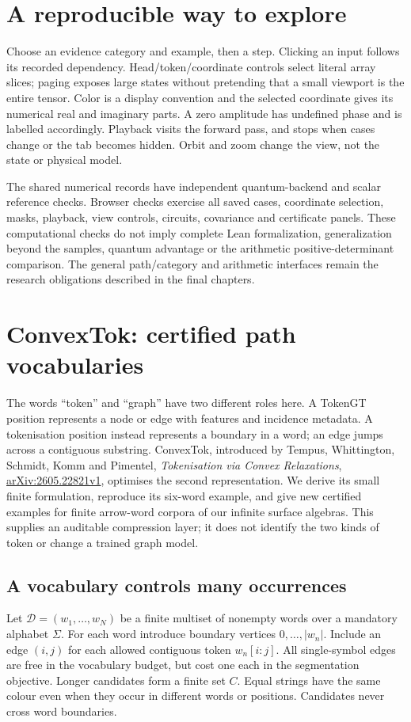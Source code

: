 \documentclass[11pt,oneside,openany]{book}
\theoremstyle{definition}\newtheorem{definition}[theorem]{Definition}
\theoremstyle{remark}\newtheorem{remark}[theorem]{Remark}
\begin{document}
\section{A reproducible way to explore}
Choose an evidence category and example, then a step. Clicking an input
follows its recorded dependency. Head/token/coordinate controls select
literal array slices; paging exposes large states without pretending that a
small viewport is the entire tensor. Color is a display convention and the
selected coordinate gives its numerical real and imaginary parts. A zero
amplitude has undefined phase and is labelled accordingly. Playback visits
the forward pass, and stops when cases change or the tab becomes hidden.
Orbit and zoom change the view, not the state or physical model.

The shared numerical records have independent quantum-backend and scalar
reference checks. Browser checks exercise all saved cases, coordinate
selection, masks, playback, view controls, circuits, covariance and certificate
panels. These computational checks do not imply complete Lean formalization,
generalization beyond the samples, quantum advantage or the arithmetic
positive-determinant comparison. The general path/category and arithmetic
interfaces remain the research obligations described in the final chapters.

\section{ConvexTok: certified path vocabularies}
\label{convextok:section}
The words ``token'' and ``graph'' have two different roles here. A TokenGT
position represents a node or edge with features and incidence metadata.
A tokenisation position instead represents a boundary in a word; an edge
jumps across a contiguous substring. ConvexTok, introduced by Tempus,
Whittington, Schmidt, Komm and Pimentel,
\emph{Tokenisation via Convex Relaxations},
\href{https://arxiv.org/html/2605.22821v1}{arXiv:2605.22821v1},
optimises the second representation. We derive its small finite
formulation, reproduce its six-word example, and give new certified
examples for finite arrow-word corpora of our infinite surface algebras.
This supplies an auditable compression layer; it does not identify the two
kinds of token or change a trained graph model.

\subsection{A vocabulary controls many occurrences}
Let $\mathcal D=(w_1,\ldots,w_N)$ be a finite multiset of nonempty words over
a mandatory alphabet $\Sigma$. For each word introduce boundary vertices
$0,\ldots,|w_n|$. Include an edge $(i,j)$ for each allowed contiguous token
$w_n[i:j]$. All single-symbol edges are free in the vocabulary budget,
but cost one each in the segmentation objective. Longer candidates form
a finite set $C$. Equal strings have the same colour even when they occur
in different words or positions. Candidates never cross word boundaries.
\end{document}
